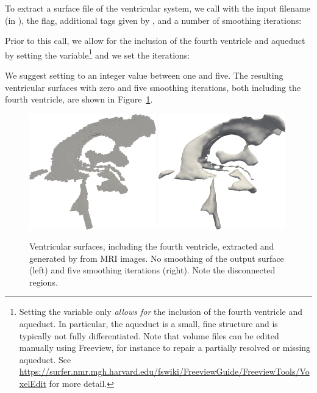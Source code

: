 \noindent To extract a surface file of the ventricular system, we call
 with the input filename (in ), the  flag, additional tags given by , and a number of smoothing iterations:


\noindent Prior to this call, we allow for the inclusion of the fourth
ventricle and aqueduct by setting the  variable\footnote{Setting 
the  variable only \textit{allows for} the inclusion of the fourth 
ventricle and aqueduct.  In particular, the aqueduct is a small, fine structure 
and is typically not fully differentiated. Note 
that volume files can be edited manually using Freeview, for instance to 
repair a partially resolved or missing aqueduct. See 
\url{https://surfer.nmr.mgh.harvard.edu/fswiki/FreeviewGuide/FreeviewTools/VoxelEdit} 
for more detail.} and we set the  iterations:


\noindent We suggest setting  to an
integer value between one and five. The resulting ventricular surfaces
with zero and five smoothing iterations, both including the fourth
ventricle, are shown in
Figure~\ref{fig:chp4:ernie-ventricles-smoothing-example}.
\begin{figure}
  \includegraphics[width=0.49\textwidth]{./graphics/chp4/ernie-vent-0smooth-r.png}
  \includegraphics[width=0.49\textwidth]{./graphics/chp4/ernie-vent-5smooth-r.png}
  \caption{Ventricular surfaces, including the fourth ventricle,
    extracted and generated by \freesurfer{} from MRI images. No
    smoothing of the output surface (left) and five smoothing
    iterations (right). Note the disconnected regions.}
  \label{fig:chp4:ernie-ventricles-smoothing-example}
\end{figure}

